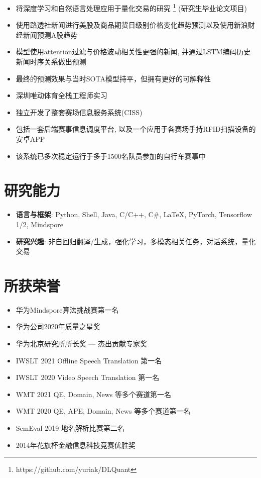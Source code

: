 \documentclass{resume}
\begin{document}
\begin{itemize}
    \item 将深度学习和自然语言处理应用于量化交易的研究 \footnote{https://github.com/yuriak/DLQuant} (研究生毕业论文项目)
    \item 使用路透社新闻进行美股及商品期货日级别价格变化趋势预测以及使用新浪财经新闻预测A股趋势
    \item 模型使用attention过滤与价格波动相关性更强的新闻, 并通过LSTM编码历史新闻时序关系做出预测
    \item 最终的预测效果与当时SOTA模型持平，但拥有更好的可解释性
\end{itemize}

\begin{itemize}
    \item 深圳唯动体育全栈工程师实习
    \item 独立开发了整套赛场信息服务系统(CISS)
    \item 包括一套后端赛事信息调度平台, 以及一个应用于各赛场手持RFID扫描设备的安卓APP
    \item 该系统已多次稳定运行于多于1500名队员参加的自行车赛事中
\end{itemize}


\section{研究能力}
\begin{itemize}[parsep=0.2ex]
  \item \textbf{语言与框架}: Python, Shell, Java, C/C++, C\#, LaTeX, PyTorch, Tensorflow 1/2, Mindspore
  \item \textbf{研究兴趣}: 非自回归翻译/生成，强化学习，多模态相关任务，对话系统，量化交易
\end{itemize}

\section{所获荣誉}
\begin{itemize}[parsep=0.2ex]
  \item 华为Mindspore算法挑战赛第一名
  \item 华为公司2020年质量之星奖
  \item 华为北京研究所所长奖 --- 杰出贡献专家奖
  \item IWSLT 2021 Offline Speech Translation 第一名
  \item IWSLT 2020 Video Speech Translation 第一名
  \item WMT 2021 QE, Domain, News 等多个赛道第一名
  \item WMT 2020 QE, APE, Domain, News 等多个赛道第一名
  \item SemEval-2019 地名解析比赛第二名
  \item 2014年花旗杯金融信息科技竞赛优胜奖
\end{itemize}
\end{document}
